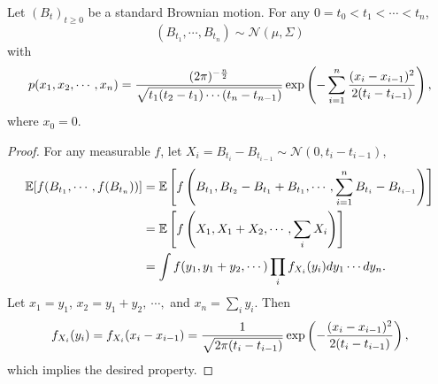 \begin{thm}
    Let $(B_t)_{t \geq 0}$ be a standard Brownian motion. For any $0 = t_0 < t_1 < \cdots < t_n$,
    \begin{equation*}
        (B_{t_1},\cdots,B_{t_n}) \sim \mathcal{N}(\mu,\Sigma)
    \end{equation*}
    with 
    \begin{equation*}
        p(x_1,x_2,\cdots,x_n) = \frac{(2\pi)^{-\frac{n}{2}}}{\sqrt{t_1(t_2 - t_1)\cdots (t_n-t_{n-1})}}\exp\left(-\sum_{i=1}^{n} \frac{(x_i-x_{i-1})^2}{2(t_i-t_{i-1})}\right),
    \end{equation*}
    where $x_0 = 0$.
\end{thm}
\begin{proof}
    For any measurable $f$, let $X_i = B_{t_i} - B_{t_{i-1}} \sim \mathcal{N}(0,t_i - t_{i-1})$,
    \begin{equation*}
        \begin{aligned}
            \mathbb{E}[f(B_{t_1},\cdots,f(B_{t_n}))] &= \mathbb{E}\left[f\left(B_{t_1}, B_{t_2} - B_{t_1}+B_{t_1},\cdots,\sum_{i=1}^nB_{t_i} - B_{t_{i-1}}\right)\right] \\
            &= \mathbb{E}\left[f\left(X_1,X_1+X_2,\cdots,\sum_iX_i\right)\right] \\
            &= \int f(y_1,y_1+y_2,\cdots)\prod_if_{X_i}(y_i) dy_1\cdots d y_n.
        \end{aligned}
    \end{equation*}
    Let $x_1 = y_1$, $x_2 = y_1+y_2,~\cdots,$ and $x_n = \sum_i y_i$. Then 
    \begin{equation*}
        f_{X_i}(y_i) = f_{X_i}(x_i - x_{i-1}) = \frac{1}{\sqrt{2\pi(t_i - t_{i-1})}}\exp\left(- \frac{(x_i-x_{i-1})^2}{2(t_i - t_{i-1})}\right),
    \end{equation*}
    which implies the desired property.
\end{proof}

